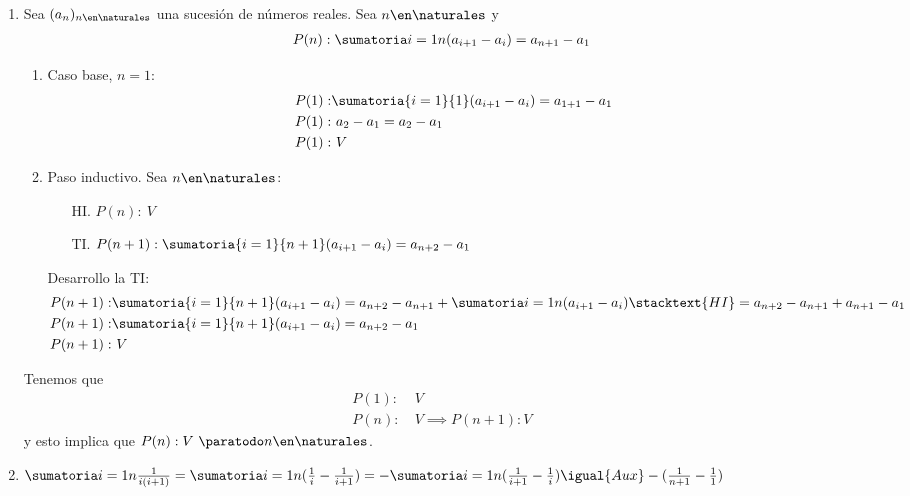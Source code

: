 \begin{enumerate}[label=\roman*)]

	\item Sea $(a_n)_{n \en \naturales }$ una sucesión de números reales. Sea $n \en \naturales $ y
	      \begin{align*}
		      P(n): \suma1n(a_{i+1} - a_i) = a_{n+1} - a_1
	      \end{align*}
	      \begin{enumerate}[label=\arabic*)]

		      \item Caso base, $ n = 1$:
		            \begin{align*}
			            P(1): & \sumatoria{i = 1}{1} (a_{i+1} - a_i) = a_{1+1} - a_1 \\
			            P(1): & \ a_2 - a_1 = a_2 - a_1                              \\
			            P(1): & \ V
		            \end{align*}

		      \item Paso inductivo. Sea $n \en \naturales $:
		            \begin{enumerate}
			            \item[HI.] $P(n): \ V$
			            \item[TI.] $ P(n+1):  \sumatoria{i=1}{n+1} (a_{i+1} - a_i) = a_{n+2} - a_1 $
		            \end{enumerate}
		            Desarrollo la TI:
		            \begin{align*}
			            P(n+1): & \sumatoria{i=1}{n+1} (a_{i+1} - a_i) =
			            a_{n+2} - a_{n+1} + \suma1n(a_{i+1} - a_i) \stacktext{HI}= a_{n+2} - a_{n+1} + a_{n+1} - a_1 \\
			            P(n+1): & \sumatoria{i=1}{n+1}(a_{i+1} - a_i) = a_{n+2} - a_1                                \\
			            P(n+1): & \ V
		            \end{align*}
	      \end{enumerate}

	      Tenemos que
	      \begin{align*}
		      P(1): & \ V                   \\
		      P(n): & \ V \implies P(n+1):V
	      \end{align*}
	      y esto implica que $P(n): V \ \paratodo n \en \naturales $.

	\item $\suma1n \frac{1}{i ( i + 1 )} =
	      \suma1n (\frac{1}{i}- \frac{1}{i+1}) =
	      - \suma1n (\frac{1}{i+1} - \frac{1}{i} ) \igual{Aux}
	      - (\frac{1}{n+1}-\frac{1}{1}) \\$


\end{enumerate}
